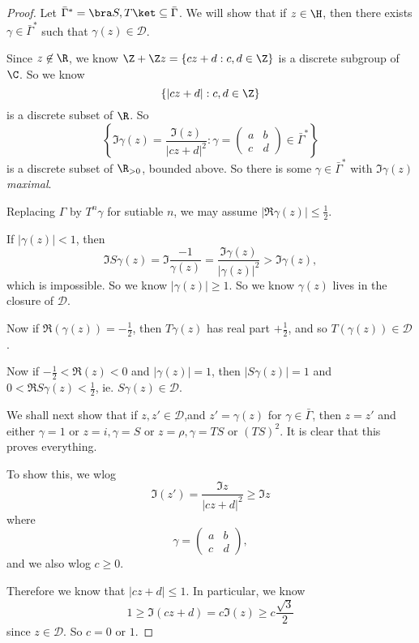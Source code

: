 \documentclass[a4paper]{article}
\begin{document}
\begin{proof}
  Let $\bar{\Gamma}^* = \bra S, T\ket \subseteq \bar{\Gamma}$. We will show that if $z \in \H$, then there exists $\gamma \in \bar\Gamma^*$ such that $\gamma(z) \in \mathcal{D}$.

  Since $z \not \in \R$, we know $\Z + \Z z = \{cz + d: c, d \in \Z\}$ is a discrete subgroup of $\C$. So we know
  \[
    \{|cz + d|: c, d \in \Z\}
  \]
  is a discrete subset of $\R$. So
  \[
    \left\{\Im \gamma(z) = \frac{\Im (z)}{|cz + d|^2}: \gamma =
    \begin{pmatrix}
      a & b\\
      c & d
    \end{pmatrix} \in \bar\Gamma^*\right\}
  \]
  is a discrete subset of $\R_{>0}$, bounded above. So there is some $\gamma \in \bar{\Gamma}^*$ with $\Im \gamma(z)$ \emph{maximal}.

  Replacing $\Gamma$ by $T^n \gamma$ for sutiable $n$, we may assume $|\Re \gamma(z)| \leq \frac{1}{2}$.

  If $|\gamma(z)| < 1$, then
  \[
    \Im S \gamma(z) = \Im \frac{-1}{\gamma(z)} = \frac{\Im \gamma(z)}{|\gamma(z)|^2} > \Im \gamma(z),
  \]
  which is impossible. So we know $|\gamma(z)| \geq 1$. So we know $\gamma(z)$ lives in the closure of $\mathcal{D}$.

  Now if $\Re(\gamma(z)) = -\frac{1}{2}$, then $T \gamma(z)$ has real part $+\frac{1}{2}$, and so $T(\gamma(z)) \in \mathcal{D}$.

  Now if $-\frac{1}{2} < \Re(z) < 0$ and $|\gamma(z)| = 1$, then $|S\gamma(z)| = 1$ and $0 < \Re S\gamma(z) < \frac{1}{2}$, ie. $S \gamma(z) \in \mathcal{D}$.

  \separator

  We shall next show that if $z, z' \in \mathcal{D}$,and $z' = \gamma(z)$ for $\gamma \in \bar{\Gamma}$, then $z = z'$ and either $\gamma = 1$ or $z = i, \gamma = S$ or $z = \rho, \gamma = TS$ or $(TS)^2$. It is clear that this proves everything.

  To show this, we wlog
  \[
    \Im (z') = \frac{\Im z}{|cz + d|^2} \geq \Im z
  \]
  where
  \[
    \gamma =
    \begin{pmatrix}
      a & b\\
      c & d
    \end{pmatrix},
  \]
  and we also wlog $c \geq 0$.

  Therefore we know that $|cz + d| \leq 1$. In particular, we know
  \[
    1 \geq \Im(cz + d) = c \Im (z) \geq c \frac{\sqrt{3}}{2}
  \]
  since $z \in \mathcal{D}$. So $c = 0$ or $1$.


\end{proof}
\end{document}
